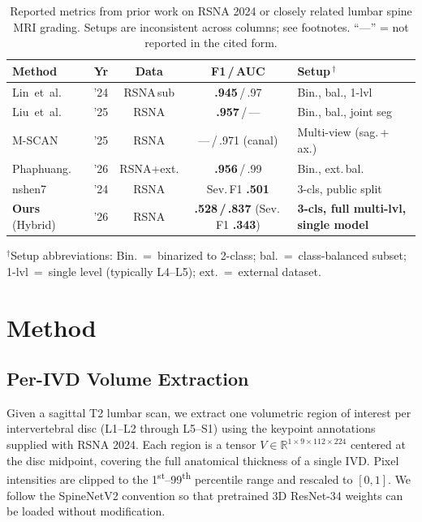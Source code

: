 \documentclass[runningheads]{llncs}
\newcommand{\best}[1]{\textcolor{best}{\textbf{#1}}}
\begin{document}
\begin{table}[t]
\centering
\caption{Reported metrics from prior work on RSNA 2024 or closely
related lumbar spine MRI grading. Setups are inconsistent across
columns; see footnotes. ``—'' = not reported in the cited form.}
\label{tab:sota}
\renewcommand{\arraystretch}{1.05}
\setlength{\tabcolsep}{4pt}
\footnotesize
\begin{tabular}{@{}lcccl@{}}
\toprule
Method & Yr & Data & F1\,/\,AUC & Setup\,$^\dagger$ \\
\midrule
Lin~et~al.~\cite{lin2024cbam}            & '24 & RSNA\,sub & \best{.945}\,/\,.97 & Bin., bal., 1-lvl \\
Liu~et~al.~\cite{aktan2025}              & '25 & RSNA    & \best{.957}\,/\,—   & Bin., bal., joint seg \\
M-SCAN~\cite{hong2025mscan}              & '25 & RSNA    & —\,/\,.971 (canal) & Multi-view (sag.\,+\,ax.) \\
Phaphuang.~\cite{phaphuangwittayakul2026}& '26 & RSNA+ext. & \best{.956}\,/\,.99 & Bin., ext.\,bal. \\
nshen7~\cite{nshen2024}                  & '24 & RSNA & Sev.\,F1 \best{.501} & 3-cls, public split \\
\midrule
\textbf{Ours} (Hybrid)                   & '26 & RSNA    & \textbf{.528\,/\,.837} (Sev.\,F1 \textbf{.343}) & \textbf{3-cls, full multi-lvl, single model} \\
\bottomrule
\end{tabular}

\vspace{2pt}
\par
{\raggedright\scriptsize
$^\dagger$Setup abbreviations: Bin.~=~binarized to 2-class;
bal.~=~class-balanced subset; 1-lvl~=~single level (typically L4--L5);
ext.~=~external dataset.\par}
\end{table}


\section{Method}
\label{sec:method}

\subsection{Per-IVD Volume Extraction}

Given a sagittal T2 lumbar scan, we extract one volumetric region of
interest per intervertebral disc (L1--L2 through L5--S1) using the
keypoint annotations supplied with RSNA 2024. Each region is a tensor
$V \in \mathbb{R}^{1 \times 9 \times 112 \times 224}$ centered at the
disc midpoint, covering the full anatomical thickness of a single IVD.
Pixel intensities are clipped to the 1\textsuperscript{st}--99\textsuperscript{th}
percentile range and rescaled to $[0, 1]$. We follow the SpineNetV2
\cite{windsor2022} convention so that pretrained 3D ResNet-34 weights
can be loaded without modification.
\end{document}

